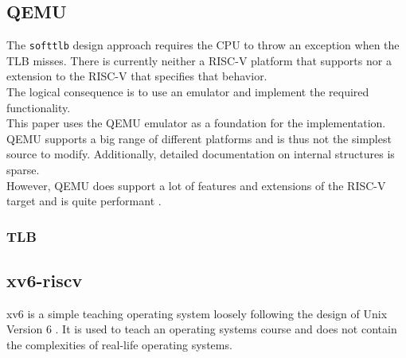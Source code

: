 \subsection{QEMU}
The \texttt{softtlb} design approach requires the CPU to throw an exception when the TLB misses. There is
currently neither a RISC-V platform that supports nor a extension to the RISC-V that specifies that behavior.\\
The logical consequence is to use an emulator and implement the required functionality.\\
This paper uses the QEMU emulator as a foundation for the implementation. QEMU supports a big range of
different platforms and is thus not the simplest source to modify. Additionally, detailed documentation
on internal structures is sparse.\\
However, QEMU does support a lot of features and extensions of the RISC-V target and is quite performant
\cite{bellard2005QEMU}.


\subsubsection{TLB}





\subsection{xv6-riscv}
xv6 is a simple teaching operating system loosely following the design of Unix Version 6 \cite{cox2011xv6}.
It is used to teach an operating systems course and does not contain the complexities of real-life
operating systems.


